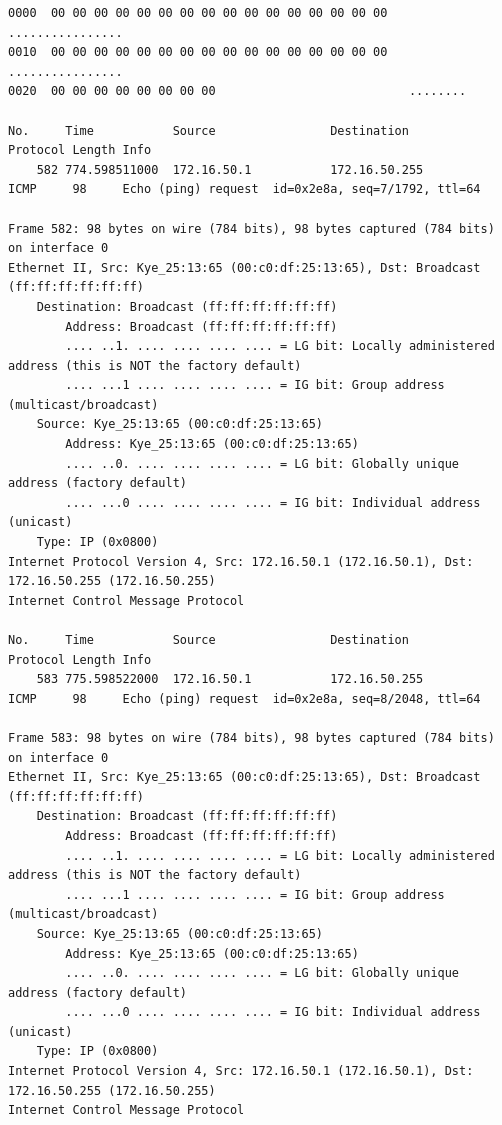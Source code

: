 \documentclass[a4paper,11pt]{article}
\begin{document}
\begin{lstlisting}
0000  00 00 00 00 00 00 00 00 00 00 00 00 00 00 00 00   ................
0010  00 00 00 00 00 00 00 00 00 00 00 00 00 00 00 00   ................
0020  00 00 00 00 00 00 00 00                           ........

No.     Time           Source                Destination           Protocol Length Info
    582 774.598511000  172.16.50.1           172.16.50.255         ICMP     98     Echo (ping) request  id=0x2e8a, seq=7/1792, ttl=64

Frame 582: 98 bytes on wire (784 bits), 98 bytes captured (784 bits) on interface 0
Ethernet II, Src: Kye_25:13:65 (00:c0:df:25:13:65), Dst: Broadcast (ff:ff:ff:ff:ff:ff)
    Destination: Broadcast (ff:ff:ff:ff:ff:ff)
        Address: Broadcast (ff:ff:ff:ff:ff:ff)
        .... ..1. .... .... .... .... = LG bit: Locally administered address (this is NOT the factory default)
        .... ...1 .... .... .... .... = IG bit: Group address (multicast/broadcast)
    Source: Kye_25:13:65 (00:c0:df:25:13:65)
        Address: Kye_25:13:65 (00:c0:df:25:13:65)
        .... ..0. .... .... .... .... = LG bit: Globally unique address (factory default)
        .... ...0 .... .... .... .... = IG bit: Individual address (unicast)
    Type: IP (0x0800)
Internet Protocol Version 4, Src: 172.16.50.1 (172.16.50.1), Dst: 172.16.50.255 (172.16.50.255)
Internet Control Message Protocol

No.     Time           Source                Destination           Protocol Length Info
    583 775.598522000  172.16.50.1           172.16.50.255         ICMP     98     Echo (ping) request  id=0x2e8a, seq=8/2048, ttl=64

Frame 583: 98 bytes on wire (784 bits), 98 bytes captured (784 bits) on interface 0
Ethernet II, Src: Kye_25:13:65 (00:c0:df:25:13:65), Dst: Broadcast (ff:ff:ff:ff:ff:ff)
    Destination: Broadcast (ff:ff:ff:ff:ff:ff)
        Address: Broadcast (ff:ff:ff:ff:ff:ff)
        .... ..1. .... .... .... .... = LG bit: Locally administered address (this is NOT the factory default)
        .... ...1 .... .... .... .... = IG bit: Group address (multicast/broadcast)
    Source: Kye_25:13:65 (00:c0:df:25:13:65)
        Address: Kye_25:13:65 (00:c0:df:25:13:65)
        .... ..0. .... .... .... .... = LG bit: Globally unique address (factory default)
        .... ...0 .... .... .... .... = IG bit: Individual address (unicast)
    Type: IP (0x0800)
Internet Protocol Version 4, Src: 172.16.50.1 (172.16.50.1), Dst: 172.16.50.255 (172.16.50.255)
Internet Control Message Protocol


\end{lstlisting}
\end{document}
